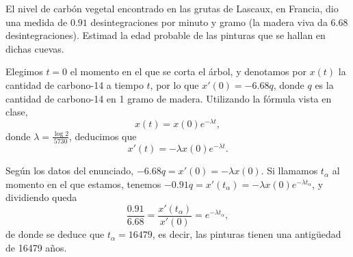 \documentclass[../ecuaciones_diferenciales.tex]{subfiles}
\begin{document}
\begin{problem}
El nivel de carbón vegetal encontrado en las grutas de Lascaux, en Francia,
dio una medida de \(0.91\) desintegraciones por minuto y gramo (la madera viva
da \(6.68\) desintegraciones). Estimad la edad probable de las pinturas que se
hallan en dichas cuevas.
\end{problem}

\begin{solution}
	Elegimos \(t = 0\) el momento en el que se corta el árbol, y denotamos por
	\(x(t)\) la cantidad de carbono-14 a tiempo \(t\), por lo que
	\(x'(0) = -6.68 q\), donde \(q\) es la cantidad de carbono-14 en 1 gramo de
	madera.  Utilizando la fórmula vista en clase,
	\[x(t) = x(0) e^{-\lambda t},\]
	donde \(\lambda = \frac{\log 2}{5730}\), deducimos que
	\[x'(t) = -\lambda x(0) e^{-\lambda t}.\]

	Según los datos del enunciado, \(-6.68 q = x'(0) = -\lambda x(0)\). Si
	llamamos \(t_\alpha\) al momento en el que estamos, tenemos
	\(-0.91 q = x'(t_\alpha) = - \lambda x(0) e^{-\lambda t_\alpha}\), y
	dividiendo queda
	\[\frac{0.91}{6.68} = \frac{x'(t_\alpha)}{x'(0)} = e^{-\lambda t_\alpha},\]
	de donde se deduce que \(t_\alpha = 16479\), es decir, las pinturas tienen una
	antigüedad de 16479 años.
\end{solution}
\end{document}
